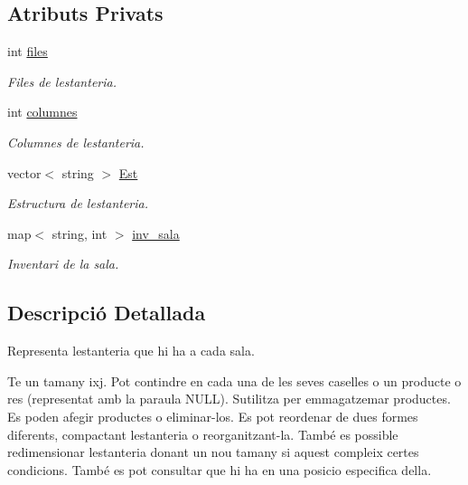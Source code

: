 \subsection*{Atributs Privats}
\begin{DoxyCompactItemize}
\item 
int \hyperlink{class_estanteria_a649ad0331b78ba3c056fd9c42f0d26fe}{files}
\begin{DoxyCompactList}\small\item\em Files de l\textquotesingle{}estanteria. \end{DoxyCompactList}\item 
int \hyperlink{class_estanteria_afd7a5087a18c8481060aef57ca8cbf78}{columnes}
\begin{DoxyCompactList}\small\item\em Columnes de l\textquotesingle{}estanteria. \end{DoxyCompactList}\item 
vector$<$ string $>$ \hyperlink{class_estanteria_a4ed61c91fcad6b38af067a4be8233097}{Est}
\begin{DoxyCompactList}\small\item\em Estructura de l\textquotesingle{}estanteria. \end{DoxyCompactList}\item 
map$<$ string, int $>$ \hyperlink{class_estanteria_af37488895058b4673e3d093a84df4c63}{inv\+\_\+sala}
\begin{DoxyCompactList}\small\item\em Inventari de la sala. \end{DoxyCompactList}\end{DoxyCompactItemize}


\subsection{Descripció Detallada}
Representa l\textquotesingle{}estanteria que hi ha a cada sala. 

Te un tamany ixj. Pot contindre en cada una de les seves caselles o un producte o res (representat amb la paraula N\+U\+LL). S\textquotesingle{}utilitza per emmagatzemar productes. Es poden afegir productes o eliminar-\/los. Es pot reordenar de dues formes diferents, compactant l\textquotesingle{}estanteria o reorganitzant-\/la. També es possible redimensionar l\textquotesingle{}estanteria donant un nou tamany si aquest compleix certes condicions. També es pot consultar que hi ha en una posicio especifica d\textquotesingle{}ella. 

